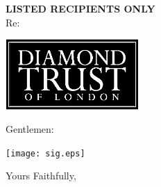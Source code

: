 \documentclass[12pt]{letter}
\begin{document}
\begin{letter}{{\bf LISTED RECIPIENTS ONLY}\\ \vspace{0.25in} Re: \protect}

\vspace*{-1.0in}
\begin{center}
\includegraphics[width=2in]{../logo_withFonts.eps}
\end{center}

\vspace*{-1.25in}

\address{
14 Greville St\\
Suite 77\\
London\\
EC1N 8BQ\\
UK\\
\\
+44 (0)20 7327 3080}

\date{}

\signature{Jason Rohrer\\Acting President\\Diamond Trust of London}


\opening{Gentlemen:}




\vspace*{0.35in}
\begin{center}
\texttt{[image: sig.eps]}
\end{center}
\vspace*{-1.25in}


\closing{Yours Faithfully,}





\end{letter}
\end{document}
